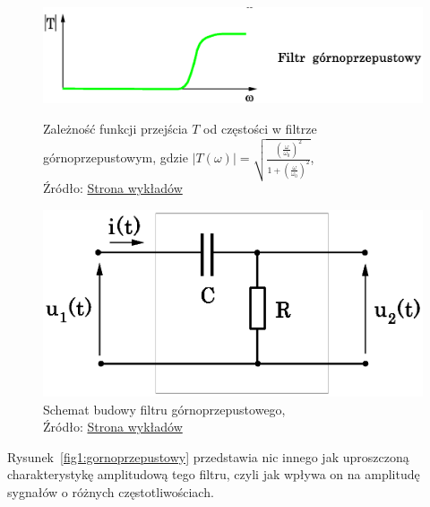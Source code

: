 \documentclass{article}
\begin{document}
            \begin{figure}[!ht]
              \centering
              \begin{minipage}{.4\textwidth}
                \centering
                \includegraphics[scale=0.40]{grafiki/gornoprzepustowy.eps}
                \caption{Zależność funkcji przejścia $T$ od częstości w filtrze górnoprzepustowym, gdzie $|T(\omega)| = \sqrt{\frac{(\frac{\omega}{\omega_0})^2}{1+(\frac{\omega}{\omega_0})^2}}$,
                \\Źródło: \href{https://spe.if.uj.edu.pl/literatura}{Strona wykładów}}
                \label{fig1:gornoprzepustowy}
              \end{minipage}
              \begin{minipage}{.4\textwidth}
                \centering
                \includegraphics[scale=0.40]{grafiki/czwornik_CR.eps}
                \caption{Schemat budowy filtru górnoprzepustowego,
                \\Źródło: \href{https://spe.if.uj.edu.pl/literatura}{Strona wykładów}}
                \label{fig4:gornoprzepustowy_2}
              \end{minipage}
            \end{figure}

            Rysunek~\ref{fig1:gornoprzepustowy} przedstawia nic innego jak uproszczoną charakterystykę amplitudową tego filtru, czyli jak wpływa on na amplitudę sygnałów o różnych częstotliwościach.
\end{document}
